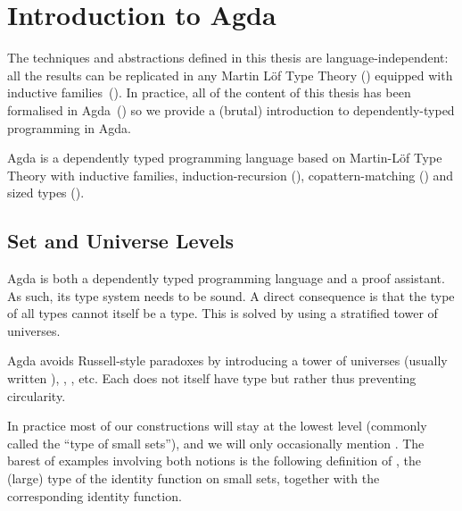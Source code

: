 \chapter{Introduction to Agda}

The techniques and abstractions defined in this thesis are language-independent:
all the results can be replicated in any Martin L\"of Type Theory
(\citeyear{martin1982constructive}) equipped with inductive
families~(\cite{dybjer1994inductive}). In practice, all of the content of this
thesis has been formalised in Agda~(\cite{norell2009dependently}) so we provide
a (brutal) introduction to dependently-typed programming in Agda.

Agda is a dependently typed programming language based on Martin-L\"{o}f Type Theory
with inductive families, induction-recursion (\cite{Dybjer1999}), copattern-matching
(\cite{abelPientkaThibodeauSetzer:popl13}) and sized types
(\cite{DBLP:journals/corr/abs-1012-4896}).

\section{Set and Universe Levels}

Agda is both a dependently typed programming language and a proof assistant.
As such, its type system needs to be sound. A direct consequence is that the
type of all types cannot itself be a type. This is solved by using a stratified
tower of universes.

\begin{feature}
Agda avoids Russell-style paradoxes by introducing a tower of universes
 (usually written ), , , etc. Each
 does not itself have type  but rather  thus
preventing circularity.
\end{feature}

In practice most of our constructions will stay at the lowest level 
(commonly called the ``type of small sets''), and we will only occasionally
mention . The barest of examples involving both notions is the
following definition of , the (large) type of the identity function on
small sets, together with  the corresponding identity function.

\begin{minipage}{0.5\textwidth}
\end{minipage}\begin{minipage}{0.5\textwidth}
\end{minipage}

